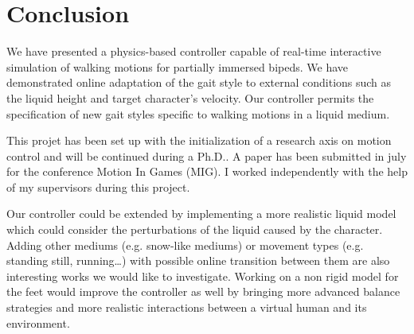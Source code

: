 \documentclass[runningheads,a4paper,10pt]{llncs}
\begin{document}
\section{Conclusion}
\label{sec:conclusion}

We have presented a physics-based controller capable of real-time interactive simulation of walking motions for partially immersed bipeds. We have demonstrated online adaptation of the gait style to external conditions such as the liquid height and target character's velocity. Our controller permits the specification of new gait styles specific to walking motions in a liquid medium.

This projet has been set up with the initialization of a research axis on motion control and will be continued during a Ph.D.. A paper has been submitted in july for the conference Motion In Games (MIG). I worked independently with the help of my supervisors during this project.

Our controller could be extended by implementing a more realistic liquid model which could consider the perturbations of the liquid caused by the character. Adding other mediums (e.g. snow-like mediums) or movement types (e.g. standing still, running…) with possible online transition between them are also interesting works we would like to investigate. Working on a non rigid model for the feet would improve the controller as well by bringing more advanced balance strategies and more realistic interactions between a virtual human and its environment. 
 



\end{document}
